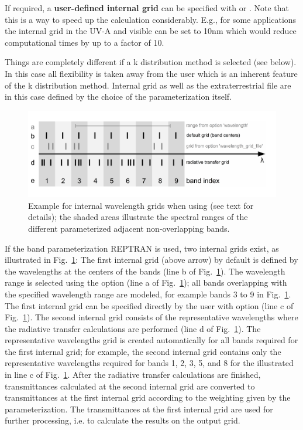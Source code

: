 If required, a {\bf user-defined internal grid} can be specified with
 or . Note
that this is a way to speed up the calculation considerably. E.g., for
some applications the internal grid in the UV-A and visible can be set
to 10nm which would reduce computational times by up to a factor of
10.

Things are completely different if a k distribution method is selected 
(see below). In this case 
all flexibility is taken away from the user which is an inherent feature
of the k distribution method. Internal grid as well as the
extraterrestrial file are in this case defined by the choice of the
parameterization itself.

\begin{figure}[t]
  \centering
  \includegraphics[width=1.\hsize]{figs/reptran_lambda_grids.pdf}
  \caption{Example for internal wavelength grids when using  (see text for details); 
     the shaded areas illustrate the spectral ranges of the different parameterized adjacent non-overlapping bands.}
  \label{fig:reptran_grid}
\end{figure}

If the band parameterization REPTRAN is used, two internal grids exist, 
as illustrated in Fig.~\ref{fig:reptran_grid}:
The first internal grid (above arrow) by default is defined by the wavelengths at the centers of the bands (line b of Fig.~\ref{fig:reptran_grid}).
The wavelength range is selected using the  option (line a of Fig.~\ref{fig:reptran_grid}); 
all bands overlapping with the specified wavelength range are modeled, for example bands 3 to 9 in Fig.~\ref{fig:reptran_grid}.
The first internal grid can be specified directly by the user with  option (line c of Fig.~\ref{fig:reptran_grid}). 
The second internal grid consists of the representative wavelengths where the radiative transfer calculations are performed (line d of Fig.~\ref{fig:reptran_grid}).
The representative wavelengths grid is created automatically for all bands required for the first internal grid; 
for example, the second internal grid contains only the representative wavelengths required for bands 1, 2, 3, 5, and 8 for the  illustrated in line c of Fig.~\ref{fig:reptran_grid}.
After the radiative transfer calculations are finished, transmittances calculated 
at the second internal grid are converted to transmittances at the first internal grid according to
the weighting given by the parameterization. The transmittances at the first internal grid
are used for further processing, i.e. to calculate the results on the output grid.

